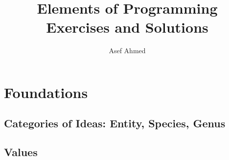 





\title{Elements of Programming Exercises and Solutions}

\author{Asef Ahmed}



\maketitle

\section{Foundations}

\subsection{Categories of Ideas: Entity, Species, Genus}

\subsection{Values}



    

